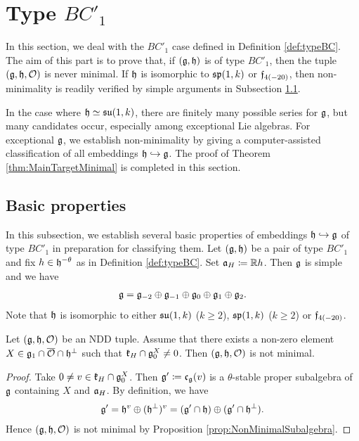 \section{Type \texorpdfstring{$BC'_1$}{BC'1}} \label{section:TypeBC1}

In this section, we deal with the $BC'_1$ case defined in Definition \ref{def:typeBC}.
The aim of this part is to prove that, if $(\mathfrak{g}, \mathfrak{h})$ is of type $BC'_1$, then the tuple $(\mathfrak{g}, \mathfrak{h}, \mathcal{O})$ is never minimal.
If $\mathfrak{h}$ is isomorphic to $\mathfrak{sp}(1,k)$ or $\mathfrak{f}_{4(-20)}$, then non-minimality is readily verified by simple arguments in Subsection \ref{subsect:EmbeddingBasic}.

In the case where $\mathfrak{h} \simeq \mathfrak{su}(1,k)$, there are finitely many possible series for $\mathfrak{g}$, but many candidates occur, especially among exceptional Lie algebras.
For exceptional $\mathfrak{g}$, we establish non-minimality by giving a computer-assisted classification of all embeddings $\mathfrak{h}\hookrightarrow \mathfrak{g}$.
The proof of Theorem \ref{thm:MainTargetMinimal} is completed in this section.

\subsection{Basic properties} \label{subsect:EmbeddingBasic}

In this subsection, we establish several basic properties of embeddings $\mathfrak{h}\hookrightarrow\mathfrak{g}$ of type $BC'_1$ in preparation for classifying them.
Let $(\mathfrak{g}, \mathfrak{h})$ be a pair of type $BC'_1$ and fix $h \in \mathfrak{h}^{-\theta}$ as in Definition \ref{def:typeBC}.
Set $\mathfrak{a}_H \coloneq \mathbb{R} h$.
Then $\mathfrak{g}$ is simple and we have
\begin{align*}
	\mathfrak{g} = \mathfrak{g}_{-2} \oplus \mathfrak{g}_{-1} \oplus \mathfrak{g}_0 \oplus \mathfrak{g}_1 \oplus \mathfrak{g}_2.
\end{align*}
Note that $\mathfrak{h}$ is isomorphic to either $\mathfrak{su}(1, k)$ ($k \geq 2$), $\mathfrak{sp}(1, k)$ ($k \geq 2$) or $\mathfrak{f}_{4(-20)}$.

\begin{lemma} \label{lem:NonMinimalInvariant}
	Let $(\mathfrak{g}, \mathfrak{h}, \mathcal{O})$ be an NDD tuple.
	Assume that there exists a non-zero element $X \in \mathfrak{g}_1 \cap \overline{\mathcal{O}} \cap \mathfrak{h}^\perp$ such that $\mathfrak{k}_H \cap \mathfrak{g}_0^X \neq 0$.
	Then $(\mathfrak{g}, \mathfrak{h}, \mathcal{O})$ is not minimal.
\end{lemma}

\begin{proof}
	Take $0\neq v \in \mathfrak{k}_H \cap \mathfrak{g}_0^X$.
	Then $\mathfrak{g'} \coloneq \mathfrak{c}_{\mathfrak{g}}(v)$ is a $\theta$-stable proper subalgebra of $\mathfrak{g}$ containing $X$ and $\mathfrak{a}_H$.
	By definition, we have
	\begin{align*}
		\mathfrak{g'} = \mathfrak{h}^v \oplus (\mathfrak{h}^\perp)^v = (\mathfrak{g'} \cap \mathfrak{h}) \oplus (\mathfrak{g'} \cap \mathfrak{h}^\perp).
	\end{align*}
	Hence $(\mathfrak{g}, \mathfrak{h}, \mathcal{O})$ is not minimal by Proposition \ref{prop:NonMinimalSubalgebra}.
\end{proof}

